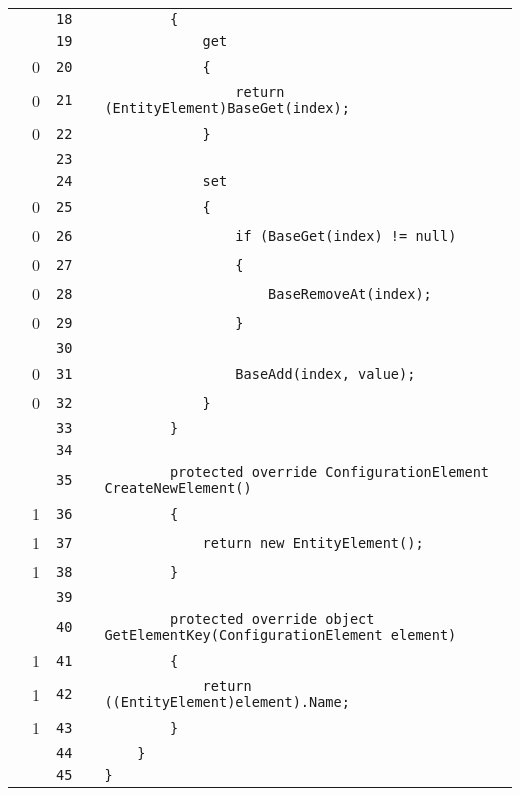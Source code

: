 \documentclass[a4paper,10pt]{article}
\begin{document}
\begin{longtable}[l]{lrrll}
\cellcolor{gray} &  & \verb~18~ & & \verb~        {~\\
\cellcolor{gray} &  & \verb~19~ & & \verb~            get~\\
\cellcolor{red} & 0 & \verb~20~ & & \verb~            {~\\
\cellcolor{red} & 0 & \verb~21~ & & \verb~                return (EntityElement)BaseGet(index);~\\
\cellcolor{red} & 0 & \verb~22~ & & \verb~            }~\\
\cellcolor{gray} &  & \verb~23~ & & \verb~~\\
\cellcolor{gray} &  & \verb~24~ & & \verb~            set~\\
\cellcolor{red} & 0 & \verb~25~ & & \verb~            {~\\
\cellcolor{red} & 0 & \verb~26~ & & \verb~                if (BaseGet(index) != null)~\\
\cellcolor{red} & 0 & \verb~27~ & & \verb~                {~\\
\cellcolor{red} & 0 & \verb~28~ & & \verb~                    BaseRemoveAt(index);~\\
\cellcolor{red} & 0 & \verb~29~ & & \verb~                }~\\
\cellcolor{gray} &  & \verb~30~ & & \verb~~\\
\cellcolor{red} & 0 & \verb~31~ & & \verb~                BaseAdd(index, value);~\\
\cellcolor{red} & 0 & \verb~32~ & & \verb~            }~\\
\cellcolor{gray} &  & \verb~33~ & & \verb~        }~\\
\cellcolor{gray} &  & \verb~34~ & & \verb~~\\
\cellcolor{gray} &  & \verb~35~ & & \verb~        protected override ConfigurationElement CreateNewElement()~\\
\cellcolor{green} & 1 & \verb~36~ & & \verb~        {~\\
\cellcolor{green} & 1 & \verb~37~ & & \verb~            return new EntityElement();~\\
\cellcolor{green} & 1 & \verb~38~ & & \verb~        }~\\
\cellcolor{gray} &  & \verb~39~ & & \verb~~\\
\cellcolor{gray} &  & \verb~40~ & & \verb~        protected override object GetElementKey(ConfigurationElement element)~\\
\cellcolor{green} & 1 & \verb~41~ & & \verb~        {~\\
\cellcolor{green} & 1 & \verb~42~ & & \verb~            return ((EntityElement)element).Name;~\\
\cellcolor{green} & 1 & \verb~43~ & & \verb~        }~\\
\cellcolor{gray} &  & \verb~44~ & & \verb~    }~\\
\cellcolor{gray} &  & \verb~45~ & & \verb~}~\\
\end{longtable}
\newpage
\end{document}
